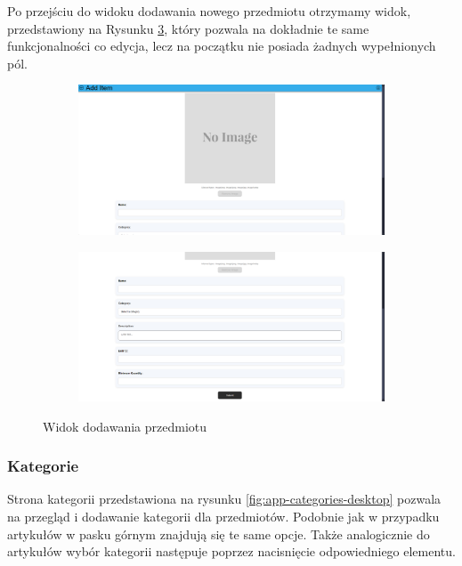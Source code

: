 \documentclass[../main.tex]{subfiles}
\begin{document}
            Po przejściu do widoku dodawania nowego przedmiotu otrzymamy widok, przedstawiony na Rysunku \ref{fig:app-items-add-desktop}, który pozwala na dokładnie te same funkcjonalności co edycja, lecz na początku nie posiada żadnych wypełnionych pól.
            \begin{figure}[H]
                \begin{subfigure}{.49\textwidth}
                    \centering
                    \includegraphics[width=\getImageWidth]{images/app-desktop/app-items-add1-desktop.png}
                    \label{fig:app-items-add1-desktop}
                \end{subfigure}
                \begin{subfigure}{.49\textwidth}
                    \centering
                    \includegraphics[width=\getImageWidth]{images/app-desktop/app-items-add2-desktop.png}
                    \label{fig:app-items-add2-desktop}
                \end{subfigure}
                \caption{Widok dodawania przedmiotu}
                \label{fig:app-items-add-desktop}
            \end{figure}

        \FloatBarrier 
        \subsubsection{Kategorie}
            Strona kategorii przedstawiona na rysunku \ref{fig:app-categories-desktop} pozwala na przegląd i dodawanie kategorii dla przedmiotów. Podobnie jak w przypadku artykułów w pasku górnym znajdują się te same opcje. Także analogicznie do artykułów wybór kategorii następuje poprzez nacisnięcie odpowiedniego elementu.
\end{document}

